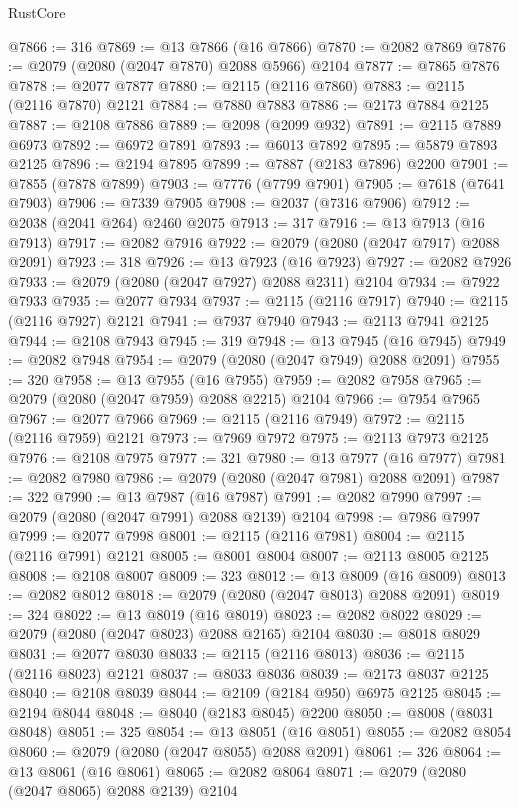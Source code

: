 \begin{lexlean}{RustCore}
\begin{coremodule}
@7866 := 316
@7869 := @13 @7866 (@16 @7866)
@7870 := @2082 @7869
@7876 := @2079 (@2080 (@2047 @7870) @2088 @5966) @2104
@7877 := @7865 @7876
@7878 := @2077 @7877
@7880 := @2115 (@2116 @7860)
@7883 := @2115 (@2116 @7870) @2121
@7884 := @7880 @7883
@7886 := @2173 @7884 @2125
@7887 := @2108 @7886
@7889 := @2098 (@2099 @932)
@7891 := @2115 @7889 @6973
@7892 := @6972 @7891
@7893 := @6013 @7892
@7895 := @5879 @7893 @2125
@7896 := @2194 @7895
@7899 := @7887 (@2183 @7896) @2200
@7901 := @7855 (@7878 @7899)
@7903 := @7776 (@7799 @7901)
@7905 := @7618 (@7641 @7903)
@7906 := @7339 @7905
@7908 := @2037 (@7316 @7906)
@7912 := @2038 (@2041 @264) @2460 @2075
@7913 := 317
@7916 := @13 @7913 (@16 @7913)
@7917 := @2082 @7916
@7922 := @2079 (@2080 (@2047 @7917) @2088 @2091)
@7923 := 318
@7926 := @13 @7923 (@16 @7923)
@7927 := @2082 @7926
@7933 := @2079 (@2080 (@2047 @7927) @2088 @2311) @2104
@7934 := @7922 @7933
@7935 := @2077 @7934
@7937 := @2115 (@2116 @7917)
@7940 := @2115 (@2116 @7927) @2121
@7941 := @7937 @7940
@7943 := @2113 @7941 @2125
@7944 := @2108 @7943
@7945 := 319
@7948 := @13 @7945 (@16 @7945)
@7949 := @2082 @7948
@7954 := @2079 (@2080 (@2047 @7949) @2088 @2091)
@7955 := 320
@7958 := @13 @7955 (@16 @7955)
@7959 := @2082 @7958
@7965 := @2079 (@2080 (@2047 @7959) @2088 @2215) @2104
@7966 := @7954 @7965
@7967 := @2077 @7966
@7969 := @2115 (@2116 @7949)
@7972 := @2115 (@2116 @7959) @2121
@7973 := @7969 @7972
@7975 := @2113 @7973 @2125
@7976 := @2108 @7975
@7977 := 321
@7980 := @13 @7977 (@16 @7977)
@7981 := @2082 @7980
@7986 := @2079 (@2080 (@2047 @7981) @2088 @2091)
@7987 := 322
@7990 := @13 @7987 (@16 @7987)
@7991 := @2082 @7990
@7997 := @2079 (@2080 (@2047 @7991) @2088 @2139) @2104
@7998 := @7986 @7997
@7999 := @2077 @7998
@8001 := @2115 (@2116 @7981)
@8004 := @2115 (@2116 @7991) @2121
@8005 := @8001 @8004
@8007 := @2113 @8005 @2125
@8008 := @2108 @8007
@8009 := 323
@8012 := @13 @8009 (@16 @8009)
@8013 := @2082 @8012
@8018 := @2079 (@2080 (@2047 @8013) @2088 @2091)
@8019 := 324
@8022 := @13 @8019 (@16 @8019)
@8023 := @2082 @8022
@8029 := @2079 (@2080 (@2047 @8023) @2088 @2165) @2104
@8030 := @8018 @8029
@8031 := @2077 @8030
@8033 := @2115 (@2116 @8013)
@8036 := @2115 (@2116 @8023) @2121
@8037 := @8033 @8036
@8039 := @2173 @8037 @2125
@8040 := @2108 @8039
@8044 := @2109 (@2184 @950) @6975 @2125
@8045 := @2194 @8044
@8048 := @8040 (@2183 @8045) @2200
@8050 := @8008 (@8031 @8048)
@8051 := 325
@8054 := @13 @8051 (@16 @8051)
@8055 := @2082 @8054
@8060 := @2079 (@2080 (@2047 @8055) @2088 @2091)
@8061 := 326
@8064 := @13 @8061 (@16 @8061)
@8065 := @2082 @8064
@8071 := @2079 (@2080 (@2047 @8065) @2088 @2139) @2104

\end{coremodule}
\end{lexlean}
